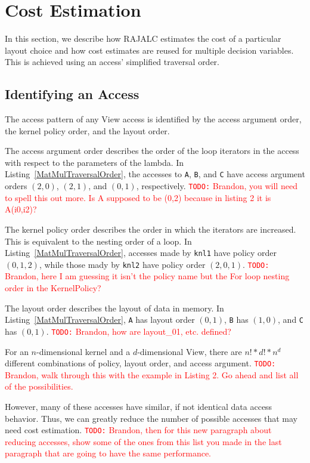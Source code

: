 \documentclass[sigconf, table]{acmart}
\newcommand{\todo}[1]{{\textcolor{red}{{\tt{TODO:}}\,\,#1 }}}
\begin{document}
\section{Cost Estimation}

In this section, we describe how RAJALC estimates the cost of a particular layout choice and how cost estimates are reused for multiple decision variables.
This is achieved using an access' simplified traversal order.

\subsection{Identifying an Access}
The access pattern of any View access is identified by the access argument order, the kernel policy order, and the layout order. 

The access argument order describes the order of the loop iterators in the access with respect to the parameters of the lambda. In Listing~\ref{MatMulTraversalOrder}, the accesses to \verb.A., \verb.B., and \verb.C. have access argument orders $(2,0)$, $(2,1)$, and $(0,1)$, respectively. 
\todo{Brandon, you will need to spell this out more.  Is A supposed to be (0,2) because in listing 2 it is A(i0,i2)?}

The kernel policy order describes the order in which the iterators are increased. 
This is equivalent to the nesting order of a loop.
In Listing~\ref{MatMulTraversalOrder}, accesses made by \verb.knl1. have policy order $(0,1,2)$, while those mady by \verb.knl2. have policy order $(2,0,1)$.
\todo{Brandon, here I am guessing it isn't the policy name but the For loop nesting order in the KernelPolicy?}

The layout order describes the layout of data in memory. 
In Listing~\ref{MatMulTraversalOrder}, \verb.A. has layout order $(0,1)$, \verb.B. has $(1,0)$, and \verb.C. has $(0,1)$.
\todo{Brandon, how are layout\_01, etc. defined?}

For an $n$-dimensional kernel and a $d$-dimensional View, there are $n! * d! * n^d$ different combinations of policy, layout order, and access argument. 
\todo{Brandon, walk through this with the example in Listing 2.  Go ahead and list all of the possibilities.}

However, many of these accesses have similar, if not identical data access behavior. 
Thus, we can greatly reduce the number of possible accesses that may need cost estimation. 
\todo{Brandon, then for this new paragraph about reducing accesses, show some of the ones from
this list you made in the last paragraph that are going to have the same performance.}
\end{document}

